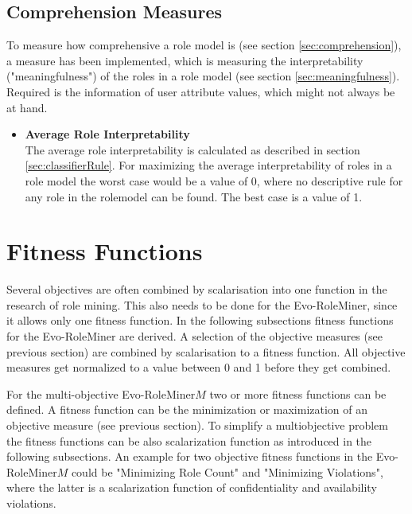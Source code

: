     \subsection{Comprehension Measures}
    \label{sec:optimizationComprehension}
    To measure how comprehensive a role model is (see section \ref{sec:comprehension}), a measure has been implemented, which is measuring the interpretability ("meaningfulness") of the roles in a role model (see section \ref{sec:meaningfulness}). Required is the information of user attribute values, which might not always be at hand.
    
    \begin{itemize}
    	\item \textbf{Average Role Interpretability}\\
    	The average role interpretability is calculated as described in section \ref{sec:classifierRule}.
    	For maximizing the average interpretability of roles in a role model the worst case would be a value of 0, where no descriptive rule for any role in the rolemodel can be found. The best case is a value of 1.
    \end{itemize}
        
    \section{Fitness Functions}
    \label{sec:fitnessFunctions}       
    Several objectives are often combined by scalarisation into one function in the research of role mining. This also needs to be done for the Evo-RoleMiner, since it allows only one fitness function. In the following subsections fitness functions for the Evo-RoleMiner are derived. A selection of the objective measures (see previous section) are combined by scalarisation to a fitness function. All objective measures get normalized to a value between 0 and 1 before they get combined.
    
    For the multi-objective Evo-RoleMiner$M$ two or more fitness functions can be defined. A fitness function can be the minimization or maximization of an objective measure (see previous section). To simplify a multiobjective problem the fitness functions can be also scalarization function as introduced in the following subsections. An example for two objective fitness functions in the Evo-RoleMiner$M$ could be "Minimizing Role Count" and "Minimizing Violations", where the latter is a scalarization function of confidentiality and availability violations.
        
